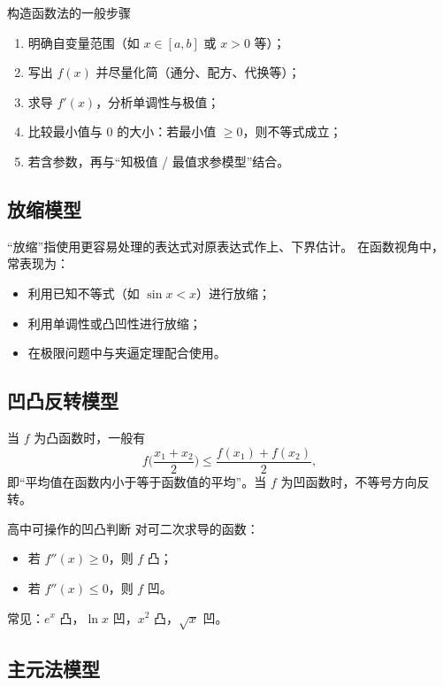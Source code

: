 \documentclass[a4paper,11pt]{ctexart}
\begin{document}
\begin{summarybox}{构造函数法的一般步骤}
  \begin{enumerate}
    \item 明确自变量范围（如 $x\in[a,b]$ 或 $x>0$ 等）；
    \item 写出 $f(x)$ 并尽量化简（通分、配方、代换等）；
    \item 求导 $f'(x)$，分析单调性与极值；
    \item 比较最小值与 $0$ 的大小：若最小值 $\ge 0$，则不等式成立；
    \item 若含参数，再与“知极值 / 最值求参模型”结合。
  \end{enumerate}
\end{summarybox}

\subsection{放缩模型}

“放缩”指使用更容易处理的表达式对原表达式作上、下界估计。
在函数视角中，常表现为：
\begin{itemize}
  \item 利用已知不等式（如 $\sin x < x$）进行放缩；
  \item 利用单调性或凸凹性进行放缩；
  \item 在极限问题中与夹逼定理配合使用。
\end{itemize}

\subsection{凹凸反转模型}

当 $f$ 为凸函数时，一般有
\[
  f\Big(\frac{x_1+x_2}{2}\Big)
  \le\frac{f(x_1)+f(x_2)}{2},
\]
即“平均值在函数内小于等于函数值的平均”。当 $f$ 为凹函数时，不等号方向反转。

\begin{notebox}{高中可操作的凹凸判断}
  对可二次求导的函数：
  \begin{itemize}
    \item 若 $f''(x)\ge 0$，则 $f$ 凸；
    \item 若 $f''(x)\le 0$，则 $f$ 凹。
  \end{itemize}
  常见：$e^x$ 凸，$\ln x$ 凹，$x^2$ 凸，$\sqrt{x}$ 凹。
\end{notebox}

\subsection{主元法模型}
\end{document}
